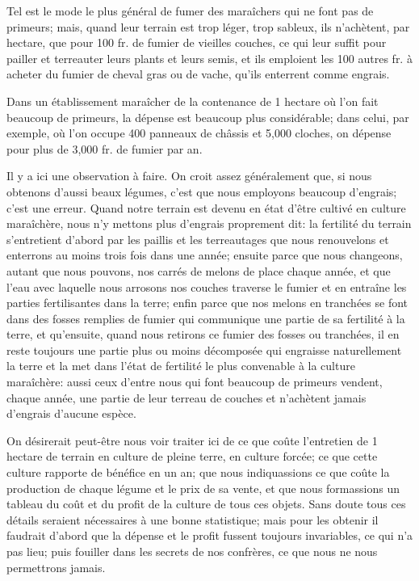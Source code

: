 \documentclass[10pt,a4paper]{book}
\begin{document}
Tel est le mode le plus général de fumer des maraîchers qui ne font pas de primeurs; mais, quand leur terrain est trop léger, trop sableux, ils n'achètent, par hectare, que pour 100 fr. de fumier de vieilles couches, ce qui leur suffit pour pailler et terreauter leurs plants et leurs semis, et ils emploient les 100 autres fr. à acheter du fumier de cheval gras ou de vache, qu'ils enterrent comme engrais.

Dans un établissement maraîcher de la contenance de 1 hectare où l'on fait beaucoup de primeurs, la dépense est beaucoup plus considérable; dans celui, par exemple, où l'on occupe 400 panneaux de châssis et 5,000 cloches, on dépense pour plus de 3,000 fr. de fumier par an.

Il y a ici une observation à faire. On croit assez généralement que, si nous obtenons d'aussi beaux légumes, c'est que nous employons beaucoup d'engrais; c'est une erreur. Quand notre terrain est devenu en état d'être cultivé en culture maraîchère, nous n'y mettons plus d'engrais proprement dit: la fertilité du terrain s'entretient d'abord par les paillis et les terreautages que nous renouvelons et enterrons au moins trois fois dans une année; ensuite parce que nous changeons, autant que nous pouvons, nos carrés de melons de place chaque année, et que l'eau avec laquelle nous arrosons nos couches traverse le fumier et en entraîne les parties fertilisantes dans la terre; enfin parce que nos melons en tranchées se font dans des fosses remplies de fumier qui communique une partie de sa fertilité à la terre, et qu'ensuite, quand nous retirons ce fumier des fosses ou tranchées, il en reste toujours une partie plus ou moins décomposée qui engraisse naturellement la terre et la met dans l'état de fertilité le plus convenable à la culture maraîchère: aussi ceux d'entre nous qui font beaucoup de primeurs vendent, chaque année, une partie de leur terreau de couches et n'achètent jamais d'engrais d'aucune espèce.

On désirerait peut-être nous voir traiter ici de ce que coûte l'entretien de 1 hectare de terrain en culture de pleine terre, en culture forcée; ce que cette culture rapporte de bénéfice en un an; que nous indiquassions ce que coûte la production de chaque légume et le prix de sa vente, et que nous formassions un tableau du coût et du profit de la culture de tous ces objets. Sans doute tous ces détails seraient nécessaires à une bonne statistique; mais pour les obtenir il faudrait d'abord que la dépense et le profit fussent toujours invariables, ce qui n'a pas lieu; puis fouiller dans les secrets de nos confrères, ce que nous ne nous permettrons jamais.
\end{document}
